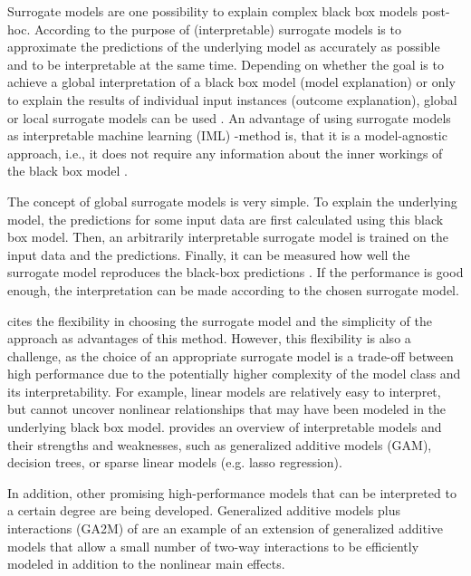 Surrogate models are one possibility to explain complex black box models post-hoc. According to \citet{Molnar.2019} the purpose of (interpretable) surrogate models is to approximate the predictions of the underlying model as accurately as possible and to be interpretable at the same time.
Depending on whether the goal is to achieve a global interpretation of a black box model (model explanation) or only to explain the results of individual input instances (outcome explanation), global or local surrogate models can be used \citep{Maratea.2021}.
An advantage of using surrogate models as interpretable machine learning (IML) -method is, that it is a model-agnostic approach, i.e., it does not require any information about the inner workings of the black box model \citep{Molnar.2019}.


The concept of global surrogate models is very simple. To explain the underlying model, the predictions for some input data are first calculated using this black box model. Then, an arbitrarily interpretable surrogate model is trained on the input data and the predictions. Finally, it can be measured how well the surrogate model reproduces the black-box predictions \citep{Molnar.2019}. If the performance is good enough, the interpretation can be made according to the chosen surrogate model.

\citet{Molnar.2019} cites the flexibility in choosing the surrogate model and the simplicity of the approach as advantages of this method. However, this flexibility is also a challenge, as the choice of an appropriate surrogate model is a trade-off between high performance due to the potentially higher complexity of the model class and its interpretability. For example, linear models are relatively easy to interpret, but cannot uncover nonlinear relationships that may have been modeled in the underlying black box model. \citet{Molnar.2019} provides an overview of interpretable models and their strengths and weaknesses, such as generalized additive models (GAM), decision trees, or sparse linear models (e.g. lasso regression). 

In addition, other promising high-performance models that can be interpreted to a certain degree are being developed. Generalized additive models plus interactions (GA2M) of \citet{Lou.2013} are an example of an extension of generalized additive models that allow a small number of two-way interactions to be efficiently modeled in addition to the nonlinear main effects.


